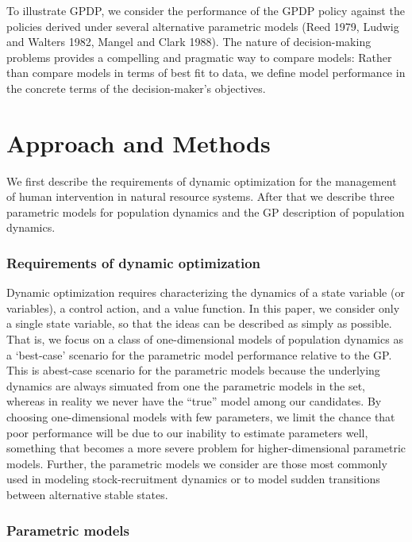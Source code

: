 \documentclass[]{components/elsarticle}
\begin{document}
To illustrate GPDP, we consider the performance of the GPDP policy
against the policies derived under several alternative parametric models
(Reed 1979, Ludwig and Walters 1982, Mangel and Clark 1988). The nature
of decision-making problems provides a compelling and pragmatic way to
compare models: Rather than compare models in terms of best fit to data,
we define model performance in the concrete terms of the
decision-maker's objectives.

\section{Approach and Methods}\label{approach-and-methods}

We first describe the requirements of dynamic optimization for the
management of human intervention in natural resource systems. After that
we describe three parametric models for population dynamics and the GP
description of population dynamics.

\subsubsection{Requirements of dynamic
optimization}\label{requirements-of-dynamic-optimization}

Dynamic optimization requires characterizing the dynamics of a state
variable (or variables), a control action, and a value function. In this
paper, we consider only a single state variable, so that the ideas can
be described as simply as possible. That is, we focus on a class of
one-dimensional models of population dynamics as a `best-case' scenario
for the parametric model performance relative to the GP. This is
abest-case scenario for the parametric models because the underlying
dynamics are always simuated from one the parametric models in the set,
whereas in reality we never have the ``true'' model among our
candidates. By choosing one-dimensional models with few parameters, we
limit the chance that poor performance will be due to our inability to
estimate parameters well, something that becomes a more severe problem
for higher-dimensional parametric models. Further, the parametric models
we consider are those most commonly used in modeling stock-recruitment
dynamics or to model sudden transitions between alternative stable
states.

\subsubsection{Parametric models}\label{parametric-models}
\end{document}
